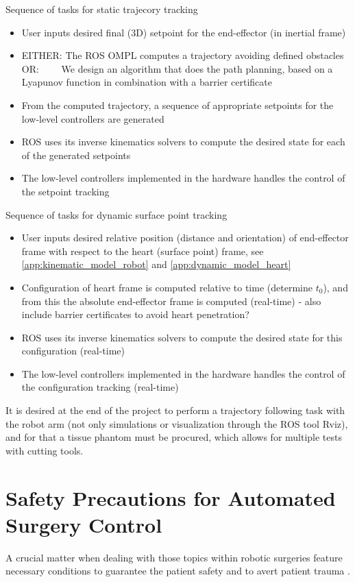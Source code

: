 Sequence of tasks for static trajecory tracking
\vspace{-3mm}
\begin{itemize}
	\itemsep-1.3mm
	\item User inputs desired final (3D) setpoint for the end-effector (in inertial frame)
	\item EITHER: The ROS OMPL computes a trajectory avoiding defined obstacles \\
	OR: $\qquad$We design an algorithm that does the path planning, based on a Lyapunov function in combination with a barrier certificate
	\item From the computed trajectory, a sequence of appropriate setpoints for the low-level controllers are generated
	\item ROS uses its inverse kinematics solvers to compute the desired state for each of the generated setpoints
	\item The low-level controllers implemented in the hardware handles the control of the setpoint tracking
\end{itemize}

Sequence of tasks for dynamic surface point tracking
\vspace{-3mm}
\begin{itemize}
	\itemsep-1.3mm
	\item User inputs desired relative position (distance and orientation) of end-effector frame with respect to the heart (surface point) frame, see \autoref{app:kinematic_model_robot} and \ref{app:dynamic_model_heart}
	\item Configuration of heart frame is computed relative to time (determine $t_0$), and from this the absolute end-effector frame is computed (real-time) - also include barrier certificates to avoid heart penetration?
	\item ROS uses its inverse kinematics solvers to compute the desired state for this configuration (real-time)
	\item The low-level controllers implemented in the hardware handles the control of the configuration tracking (real-time)
\end{itemize}

It is desired at the end of the project to perform a trajectory following task with the robot arm (not only simulations or visualization through the ROS tool Rviz), and for that a tissue phantom must be procured, which allows for multiple tests with cutting tools.

\section{Safety Precautions for Automated Surgery Control}\label{sec:safety-def}
A crucial matter when dealing with those topics within robotic surgeries feature necessary conditions to guarantee the patient safety and to avert patient trauma \citep{bib:safety}.




